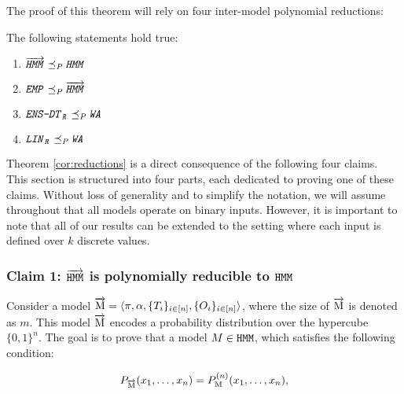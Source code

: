 The proof of this theorem will rely on four inter-model polynomial reductions:

\begin{unumberedclaim}
The following statements hold true:
\begin{enumerate}
    \item $\overrightarrow{\texttt{\emph{HMM}}} \preceq_{\emph{P}} 
\texttt{\emph{HMM}}$
   \item $\texttt{\emph{EMP}} \preceq_{\emph{P}} \overrightarrow{\texttt{\emph{HMM}}}$ 
   \item $\texttt{\emph{ENS-DT}}_{\texttt{\emph{R}}}\preceq_{\emph{P}} \texttt{\emph{WA}}$
   \item $\texttt{\emph{LIN}}_{\texttt{\emph{R}}} \preceq_{\emph{P}} \texttt{\emph{WA}}$
\end{enumerate}
\end{unumberedclaim}

Theorem \ref{cor:reductions} is a direct consequence of the following four claims. This section is structured into four parts, each dedicated to proving one of these claims. Without loss of generality and to simplify the notation, we will assume throughout that all models operate on binary inputs. However, it is important to note that all of our results can be extended to the setting where each input is defined over $k$ discrete values.


\subsubsection{Claim 1: $\overrightarrow{\texttt{\text{HMM}}}$ is polynomially reducible to $\texttt{\text{HMM}}$}

Consider a model $\overrightarrow{\tt{\text{M}}} = \langle \pi, \alpha, \{T_{i}\}_{i \in [n]}, \{O_{i}\}_{i \in [n]}\rangle$, where the size of $\overrightarrow{\text{M}}$ is denoted as $m$. This model $\overrightarrow{\text{M}}$ encodes a probability distribution over the hypercube $\{0,1\}^{n}$. The goal is to prove that a model $M \in \texttt{\text{HMM}}$, which satisfies the following condition:

\begin{equation} \label{app:eq
} P_{\overrightarrow{\text{M}}}(x_{1}, \ldots, x_{n}) = P_{\text{M}}^{(n)}(x_{1}, \ldots, x_{n}), \end{equation}


